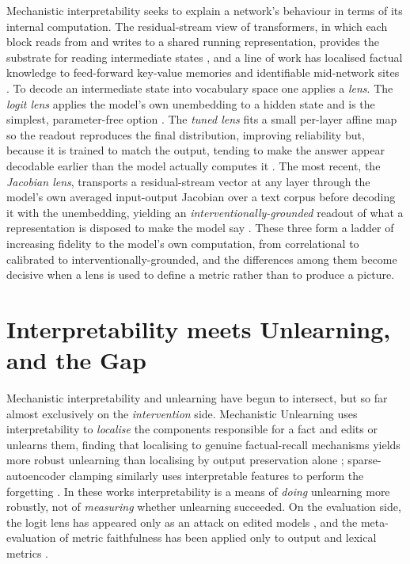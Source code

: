 Mechanistic interpretability seeks to explain a network's behaviour in terms of its internal computation.
The residual-stream view of transformers, in which each block reads from and writes to a shared running
representation, provides the substrate for reading intermediate states \citep{elhage2021framework}, and a
line of work has localised factual knowledge to feed-forward key-value memories and identifiable
mid-network sites \citep{geva2021kv,meng2022rome}. To decode an intermediate state into vocabulary space one
applies a \emph{lens}. The \emph{logit lens} applies the model's own unembedding to a hidden state and is
the simplest, parameter-free option \citep{nostalgebraist2020logitlens}. The \emph{tuned lens} fits a small
per-layer affine map so the readout reproduces the final distribution, improving reliability but, because it
is trained to match the output, tending to make the answer appear decodable earlier than the model actually
computes it \citep{belrose2023tunedlens}. The most recent, the \emph{Jacobian lens}, transports a
residual-stream vector at any layer through the model's own averaged input-output Jacobian over a text
corpus before decoding it with the unembedding, yielding an \emph{interventionally-grounded} readout of what
a representation is disposed to make the model say \citep{anthropic2026workspace}. These three form a ladder
of increasing fidelity to the model's own computation, from correlational to calibrated to
interventionally-grounded, and the differences among them become decisive when a lens is used to define a
metric rather than to produce a picture.

\section{Interpretability meets Unlearning, and the Gap}
\label{sec:rw-gap}

Mechanistic interpretability and unlearning have begun to intersect, but so far almost exclusively on the
\emph{intervention} side. Mechanistic Unlearning uses interpretability to \emph{localise} the components
responsible for a fact and edits or unlearns them, finding that localising to genuine factual-recall
mechanisms yields more robust unlearning than localising by output preservation alone
\citep{guo2024mechanistic}; sparse-autoencoder clamping similarly uses interpretable features to perform the
forgetting \citep{sae2025clamping}. In these works interpretability is a means of \emph{doing} unlearning
more robustly, not of \emph{measuring} whether unlearning succeeded. On the evaluation side, the logit lens
has appeared only as an attack on edited models \citep{patil2023candelete}, and the meta-evaluation of
metric faithfulness has been applied only to output and lexical metrics \citep{dorna2025openunlearning}.

